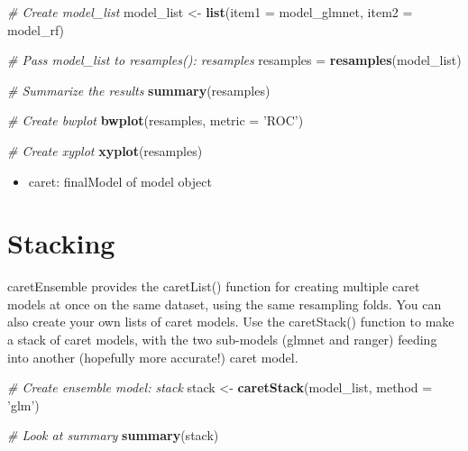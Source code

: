 \documentclass[]{book}
\newenvironment{Shaded}{\begin{snugshade}}{\end{snugshade}}
\newcommand{\KeywordTok}[1]{\textcolor[rgb]{0.13,0.29,0.53}{\textbf{#1}}}
\newcommand{\DataTypeTok}[1]{\textcolor[rgb]{0.13,0.29,0.53}{#1}}
\newcommand{\StringTok}[1]{\textcolor[rgb]{0.31,0.60,0.02}{#1}}
\newcommand{\CommentTok}[1]{\textcolor[rgb]{0.56,0.35,0.01}{\textit{#1}}}
\newcommand{\OtherTok}[1]{\textcolor[rgb]{0.56,0.35,0.01}{#1}}
\newcommand{\OperatorTok}[1]{\textcolor[rgb]{0.81,0.36,0.00}{\textbf{#1}}}
\newcommand{\NormalTok}[1]{#1}
\providecommand{\tightlist}{%
  \setlength{\itemsep}{0pt}\setlength{\parskip}{0pt}}
\theoremstyle{definition}
\theoremstyle{definition}
\theoremstyle{definition}
\theoremstyle{remark}
\begin{document}
\begin{Shaded}
\begin{Highlighting}[]
\CommentTok{# Create model_list}
\NormalTok{model_list <-}\StringTok{ }\KeywordTok{list}\NormalTok{(}\DataTypeTok{item1 =}\NormalTok{ model_glmnet, }\DataTypeTok{item2 =}\NormalTok{ model_rf)}

\CommentTok{# Pass model_list to resamples(): resamples}
\NormalTok{resamples =}\StringTok{ }\KeywordTok{resamples}\NormalTok{(model_list)}

\CommentTok{# Summarize the results}
\KeywordTok{summary}\NormalTok{(resamples)}

\CommentTok{# Create bwplot}
\KeywordTok{bwplot}\NormalTok{(resamples, }\DataTypeTok{metric =} \StringTok{'ROC'}\NormalTok{)}

\CommentTok{# Create xyplot}
\KeywordTok{xyplot}\NormalTok{(resamples)}
\end{Highlighting}
\end{Shaded}

\begin{Shaded}
\end{Shaded}

\begin{itemize}
\tightlist
\item
  caret: finalModel of model object
\end{itemize}

\section{Stacking}\label{stacking}

caretEnsemble provides the caretList() function for creating multiple
caret models at once on the same dataset, using the same resampling
folds. You can also create your own lists of caret models. Use the
caretStack() function to make a stack of caret models, with the two
sub-models (glmnet and ranger) feeding into another (hopefully more
accurate!) caret model.

\begin{Shaded}
\begin{Highlighting}[]
\CommentTok{# Create ensemble model: stack}
\NormalTok{stack <-}\StringTok{ }\KeywordTok{caretStack}\NormalTok{(model_list, }\DataTypeTok{method =} \StringTok{'glm'}\NormalTok{)}

\CommentTok{# Look at summary}
\KeywordTok{summary}\NormalTok{(stack)}
\end{Highlighting}
\end{Shaded}
\end{document}
